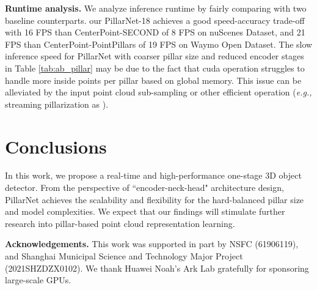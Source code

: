 \documentclass[runningheads]{llncs}
\begin{document}
{\flushleft \bf Runtime analysis.}
We analyze inference runtime by fairly comparing with two baseline counterparts.
our PillarNet-18 achieves a good speed-accuracy trade-off with 16 FPS than CenterPoint-SECOND of 8 FPS on nuScenes Dataset, and 21 FPS than CenterPoint-PointPillars of 19 FPS on Waymo Open Dataset.
The slow inference speed for PillarNet with coarser pillar size and reduced encoder stages in Table \ref{tab:ab_pillar} may be due to the fact that cuda  operation struggles to handle more inside points per pillar based on global memory.
This issue can be alleviated by the input point cloud sub-sampling or other efficient operation (\textit{e.g.,} streaming pillarization as \cite{chen2021polarstream}).


\section{Conclusions}

In this work, we propose a real-time and high-performance one-stage 3D object detector. From the perspective of ``encoder-neck-head" architecture design, PillarNet achieves the scalability and flexibility for the hard-balanced pillar size and model complexities. 
We expect that our findings will stimulate further research into pillar-based point cloud representation learning.


{\flushleft \bf Acknowledgements.}
This work was supported in part by NSFC (61906119), and Shanghai Municipal Science and Technology Major Project (2021SHZDZX0102). We thank Huawei Noah’s Ark Lab gratefully for sponsoring large-scale GPUs. 







\clearpage


\end{document}
